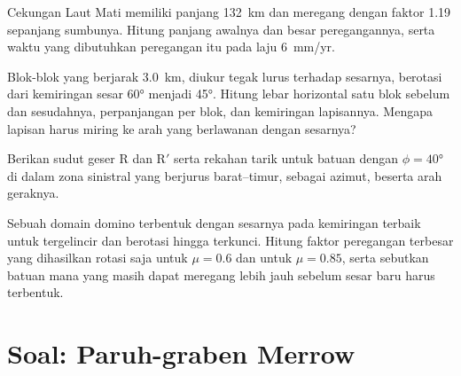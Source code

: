 \begin{exercise}[$\star\star$]\label{exo:b3:extension-strike-slip:9}
Cekungan Laut Mati memiliki panjang \qty{132}{km} dan meregang dengan faktor 1.19
sepanjang sumbunya. Hitung panjang awalnya dan besar peregangannya, serta waktu
yang dibutuhkan peregangan itu pada laju \qty{6}{mm/yr}.
\end{exercise}

\begin{exercise}[$\star\star\star$]\label{exo:b3:extension-strike-slip:10}
Blok-blok yang berjarak \qty{3.0}{km}, diukur tegak lurus terhadap sesarnya, berotasi
dari kemiringan sesar \ang{60} menjadi \ang{45}. Hitung lebar horizontal satu
blok sebelum dan sesudahnya, perpanjangan per blok, dan kemiringan lapisannya.
Mengapa lapisan harus miring ke arah yang berlawanan dengan sesarnya?
\end{exercise}

\begin{exercise}[$\star\star\star$]\label{exo:b3:extension-strike-slip:11}
Berikan sudut geser R dan R$'$ serta rekahan tarik untuk batuan dengan
$\phi = \ang{40}$ di dalam zona sinistral yang berjurus barat--timur, sebagai
azimut, beserta arah geraknya.
\end{exercise}

\begin{exercise}[$\star\star\star$]\label{exo:b3:extension-strike-slip:12}
Sebuah domain domino terbentuk dengan sesarnya pada kemiringan terbaik untuk tergelincir dan
berotasi hingga terkunci. Hitung faktor peregangan terbesar yang dihasilkan
rotasi saja untuk $\mu = 0.6$ dan untuk $\mu = 0.85$, serta sebutkan batuan mana yang
masih dapat meregang lebih jauh sebelum sesar baru harus terbentuk.
\end{exercise}

\section{Soal: Paruh-graben Merrow}


